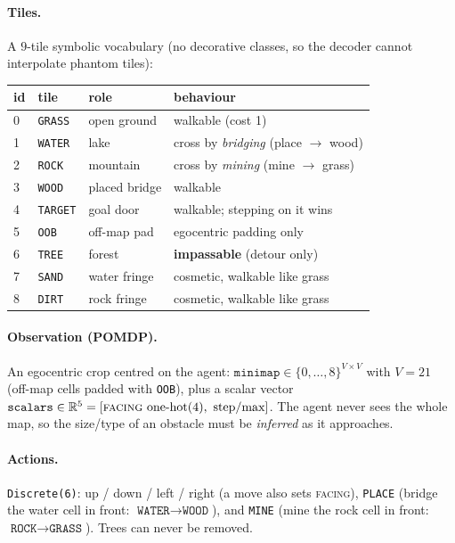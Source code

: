 \documentclass[11pt]{article}
\newcommand{\code}[1]{\texttt{#1}}
\begin{document}
\paragraph{Tiles.} A $9$-tile symbolic vocabulary (no decorative classes, so the
decoder cannot interpolate phantom tiles):
\begin{center}\small
\begin{tabular}{@{}llll@{}}
\toprule
id & tile & role & behaviour\\
\midrule
0 & \code{GRASS}  & open ground & walkable (cost 1)\\
1 & \code{WATER}  & lake        & cross by \emph{bridging} (place $\to$ wood)\\
2 & \code{ROCK}   & mountain    & cross by \emph{mining} (mine $\to$ grass)\\
3 & \code{WOOD}   & placed bridge & walkable\\
4 & \code{TARGET} & goal door   & walkable; stepping on it wins\\
5 & \code{OOB}    & off-map pad & egocentric padding only\\
6 & \code{TREE}   & forest      & \textbf{impassable} (detour only)\\
7 & \code{SAND}   & water fringe & cosmetic, walkable like grass\\
8 & \code{DIRT}   & rock fringe  & cosmetic, walkable like grass\\
\bottomrule
\end{tabular}
\end{center}

\paragraph{Observation (POMDP).} An egocentric crop centred on the agent:
$\code{minimap}\in\{0,\dots,8\}^{V\times V}$ with $V=21$ (off-map cells padded with
\code{OOB}), plus a scalar vector $\code{scalars}\in\mathbb{R}^{5}=[\textsc{facing}
\text{ one-hot}(4),\ \text{step}/\text{max}]$. The agent never sees the whole map,
so the size/type of an obstacle must be \emph{inferred} as it approaches.

\paragraph{Actions.} \code{Discrete(6)}: up / down / left / right (a move also sets
\textsc{facing}), \code{PLACE} (bridge the water cell in front: $\code{WATER}\to
\code{WOOD}$), and \code{MINE} (mine the rock cell in front: $\code{ROCK}\to
\code{GRASS}$). Trees can never be removed.
\end{document}
